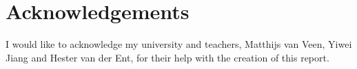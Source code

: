 \section{Acknowledgements}
I would like to acknowledge my university and teachers, Matthijs van Veen, Yiwei Jiang and Hester van der Ent, for their help with the creation of this report.